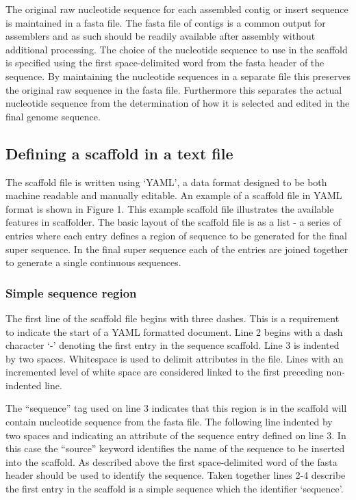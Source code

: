 \documentclass[10pt]{bmc_article}
\newenvironment{bmcformat}{\begin{raggedright}\baselineskip20pt\sloppy\setboolean{publ}{false}}{\end{raggedright}\baselineskip20pt\sloppy}
\begin{document}
\begin{bmcformat}
The original raw nucleotide sequence for each assembled contig or insert
sequence is maintained in a fasta file. The fasta file of contigs is a common
output for assemblers and as such should be readily available after assembly
without additional processing. The choice of the nucleotide sequence to use in
the scaffold is specified using the first space-delimited word from the fasta
header of the sequence. By maintaining the nucleotide sequences in a separate
file this preserves the original raw sequence in the fasta file. Furthermore
this separates the actual nucleotide sequence from the determination of how it
is selected and edited in the final genome sequence. \pb

\subsection*{Defining a scaffold in a text file} %

The scaffold file is written using `YAML', a data format designed to be both
machine readable and manually editable. An example of a scaffold file in YAML
format is shown in Figure 1. This example scaffold file illustrates the
available features in scaffolder. The basic layout of the scaffold file is as
a list - a series of entries where each entry defines a region of sequence to
be generated for the final super sequence. In the final super sequence each of
the entries are joined together to generate a single continuous sequences. \pb

\subsubsection*{Simple sequence region} %

The first line of the scaffold file begins with three dashes. This is
a requirement to indicate the start of a YAML formatted document. Line 2 begins
with a dash character `-' denoting the first entry in the sequence scaffold.
Line 3 is indented by two spaces. Whitespace is used to delimit attributes in
the file. Lines with an incremented level of white space are considered linked
to the first preceding non-indented line. \pb

The ``sequence'' tag used on line 3 indicates that this region is in the
scaffold will contain nucleotide sequence from the fasta file. The following
line indented by two spaces and indicating an attribute of the sequence entry
defined on line 3. In this case the ``source'' keyword identifies the name of
the sequence to be inserted into the scaffold. As described above the first
space-delimited word of the fasta header should be used to identify the
sequence. Taken together lines 2-4 describe the first entry in the scaffold is
a simple sequence which the identifier `sequence'. \pb


\end{bmcformat}
\end{document}
